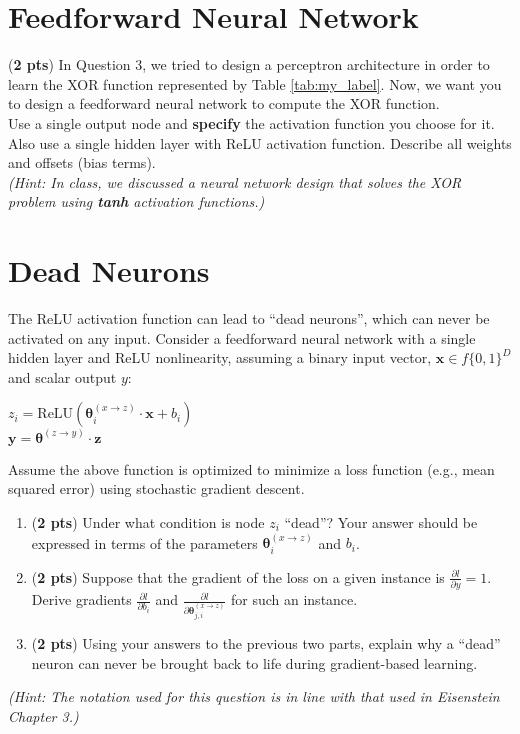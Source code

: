 \documentclass[11pt, letterpaper]{article}
\begin{document}
\section{Feedforward Neural Network}
    
    (\textbf{2 pts}) In Question 3, we tried to design a perceptron architecture in order to learn the XOR function represented by Table \ref{tab:my_label}. Now, we want you to design a feedforward neural network to compute the XOR function.\\
    
    \noindent Use a single output node and \textbf{specify} the activation function you choose for it. Also use a single hidden layer with ReLU activation function.  Describe all weights and offsets (bias terms).\\
    
    \noindent \textit{(Hint: In class, we discussed a neural network design that solves the XOR problem using \textbf{tanh} activation functions.)}

\newpage
    \section{Dead Neurons}
        
    The ReLU activation function can lead to ``dead neurons'', which can never be activated on any input. Consider a feedforward neural network with a single hidden layer and ReLU nonlinearity, assuming a binary input vector, $\mathbf{x} \in f\{0,1\}^D$  and scalar output $y$:
    \begin{center}
    $z_i = \text{ReLU}(\mathbf{\theta}_i^{(x \rightarrow z)} \cdot \mathbf{x} + b_i)$ \\
    $\mathbf{y} = \mathbf{\theta}^{(z \rightarrow y)} \cdot \mathbf{z}$
    \end{center}
    
    \noindent Assume the above function is optimized to minimize a loss function (e.g., mean squared error) using stochastic gradient descent. 
    
    \begin{enumerate}[label=(\alph*)]
        \item (\textbf{2 pts}) Under what condition is node $z_i$ ``dead''? Your answer should be expressed in terms of the parameters $\mathbf{\theta}_i^{(x \rightarrow z)}$ and $b_i$.
        
        \item (\textbf{2 pts}) Suppose that the gradient of the loss on a given instance is $\frac{\partial l}{\partial y} = 1$. Derive gradients $\frac{\partial l}{\partial b_i}$ and $\frac{\partial l}{\partial \mathbf{\theta}_{j,i}^{(x \rightarrow z)}}$ for such an instance.
        
        \item (\textbf{2 pts}) Using your answers to the previous two parts, explain why a ``dead'' neuron can never be brought back to life during gradient-based learning. 
        
    \end{enumerate}
    \textit{(Hint: The notation used for this question is in line with that used in Eisenstein Chapter 3.)}
    
\end{document}
